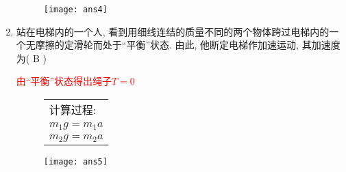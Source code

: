 \begin{enumerate}
\begin{note}
\begin{figure}[ht]
\begin{minipage}[ht]{0.6\linewidth}
\begin{table}[H]
                \end{table}  
            \end{minipage}
            \begin{minipage}[h]{0.3\linewidth}
                \texttt{[image: ans4]}
            \end{minipage}
        \end{figure}
    \end{note}
\item 站在电梯内的一个人, 看到用细线连结的质量不同的两个物体跨过电梯内的一个无摩擦的定滑轮而处于“平衡”状态. 由此, 他断定电梯作加速运动, 其加速度为( B )
\begin{note}
    \textcolor{red}{由“平衡”状态得出绳子$T=0$}
    \begin{figure}[ht]
        \begin{minipage}[ht]{0.6\linewidth}
            \begin{table}[H]
                \begin{tabular}{l}
                   \qquad 计算过程:\\
                   \qquad \qquad $m_1 g = m_1a$ \\
                   \qquad \qquad $m_2 g = m_2a$ \\
                \end{tabular}
            \end{table}  
        \end{minipage}
        \begin{minipage}[h]{0.3\linewidth}
            \texttt{[image: ans5]}
        \end{minipage}
    \end{figure}
\end{note}
\end{enumerate}


